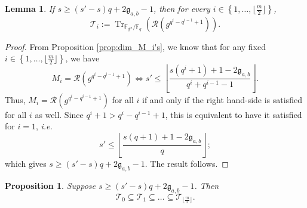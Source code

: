 \documentclass[a4paper]{article}
\newtheorem{proposition}[thm]{Proposition}
\newtheorem{lemma}[thm]{Lemma}
\theoremstyle{definition}
\theoremstyle{remark}
\newcommand{\calR}{\mathcal{R}}
\newcommand{\calT}{\mathcal{T}}
\newcommand{\fq}{\mathbb{F}_{q}}
\newcommand{\Tr}[1]{\operatorname{Tr}_{\mathbb{F}_{q^m}/\fq}\left(#1\right)}
\newcommand{\set}[1]{\left\{#1\right\}}
\begin{document}
\begin{lemma} \label{lem:cond_inclusion_T_i's}
    If $s \geq (s'-s)q+2\mathfrak{g}_{a,b}-1$, then for every $i \in \set{1,\dots,\lfloor \frac{m}{2} \rfloor}$,
    $$\calT_i := \Tr{\calR(g^{q^i-q^{i-1}+1})}.$$
\end{lemma}

\begin{proof}
    From Proposition \ref{prop:dim_M_i's}, we know that for any fixed $i \in \set{1,\dots,\lfloor \frac{m}{2} \rfloor}$, we have 
    $$M_i = \calR(g^{q^i-q^{i-1}+1}) \iff  s' \leq \left\lfloor \dfrac{s(q^i+1)+1-2\mathfrak{g}_{a,b}}{q^i+q^{i-1}-1}\right\rfloor.$$
    Thus, $M_i = \calR(g^{q^i-q^{i-1}+1})$ for all $i$ if and only if the right hand-side is satisfied for all $i$ as well. Since $q^i+1 > q^i-q^{i-1}+1$, this is equivalent to have it satisfied for $i=1$, \emph{i.e.}
    $$s' \leq \left\lfloor \dfrac{s(q+1)+1-2\mathfrak{g}_{a,b}}{q}\right\rfloor;$$
    which gives $s \geq (s'-s)q+2\mathfrak{g}_{a,b}-1$. The result follows.
\end{proof}

\begin{proposition} \label{prop:inclusion_T_i's} Suppose $s \geq (s'-s)q+2\mathfrak{g}_{a,b}-1$. Then
    $$\calT_0 \subseteq \calT_1 \subseteq \dots \subseteq \calT_{\lfloor \frac{m}{2}\rfloor}.$$
\end{proposition}
\end{document}
